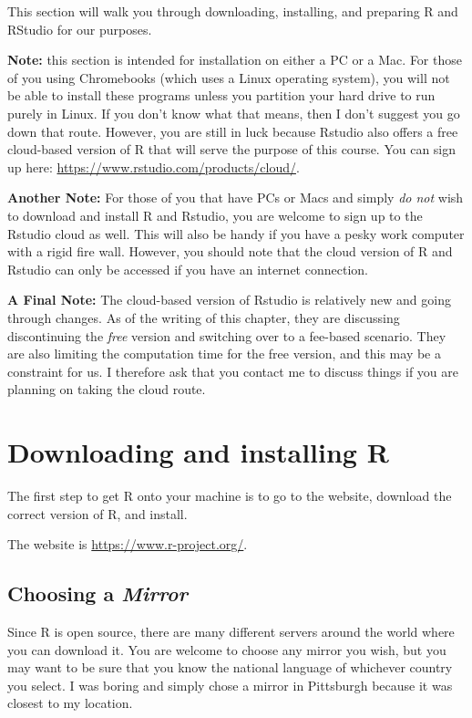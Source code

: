 \documentclass[
]{book}
\begin{document}
This section will walk you through downloading, installing, and preparing R and RStudio for our purposes.

\textbf{Note:} this section is intended for installation on either a PC or a Mac. For those of you using Chromebooks (which uses a Linux operating system), you will not be able to install these programs unless you partition your hard drive to run purely in Linux. If you don't know what that means, then I don't suggest you go down that route. However, you are still in luck because Rstudio also offers a free cloud-based version of R that will serve the purpose of this course. You can sign up here: \url{https://www.rstudio.com/products/cloud/}.

\textbf{Another Note:} For those of you that have PCs or Macs and simply \emph{do not} wish to download and install R and Rstudio, you are welcome to sign up to the Rstudio cloud as well. This will also be handy if you have a pesky work computer with a rigid fire wall. However, you should note that the cloud version of R and Rstudio can only be accessed if you have an internet connection.

\textbf{A Final Note:} The cloud-based version of Rstudio is relatively new and going through changes. As of the writing of this chapter, they are discussing discontinuing the \emph{free} version and switching over to a fee-based scenario. They are also limiting the computation time for the free version, and this may be a constraint for us. I therefore ask that you contact me to discuss things if you are planning on taking the cloud route.

\hypertarget{downloading-and-installing-r}{%
\section{Downloading and installing R}\label{downloading-and-installing-r}}

The first step to get R onto your machine is to go to the website, download the correct version of R, and install.

The website is \url{https://www.r-project.org/}.

\hypertarget{choosing-a-mirror}{%
\subsection{\texorpdfstring{Choosing a \emph{Mirror}}{Choosing a Mirror}}\label{choosing-a-mirror}}

Since R is open source, there are many different servers around the world where you can download it. You are welcome to choose any mirror you wish, but you may want to be sure that you know the national language of whichever country you select. I was boring and simply chose a mirror in Pittsburgh because it was closest to my location.
\end{document}
